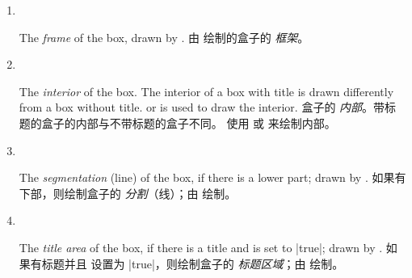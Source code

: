 \begin{enumerate}
\item 
~\vspace*{-1em}
\begin{stripedbox}
The \emph{frame} of the box, drawn by .
\tcblower
由  绘制的盒子的 \emph{框架}。
\end{stripedbox}

\item 
~\vspace*{-1em}
\begin{stripedbox}
The \emph{interior} of the box. 
The interior of a box with title is   drawn differently from a box without title.
 or    is used to draw the interior.
\tcblower
盒子的 \emph{内部}。带标题的盒子的内部与不带标题的盒子不同。 使用  或  来绘制内部。
\end{stripedbox}

\item 
~\vspace*{-1em}
\begin{stripedbox}
The \emph{segmentation} (line) of the box, if there is a lower part;
drawn by .
\tcblower
如果有下部，则绘制盒子的 \emph{分割}（线）；由  绘制。
\end{stripedbox}

\item 
~\vspace*{-1em}
\begin{stripedbox}
The \emph{title area} of the box, if there is a title and
 is set to |true|; drawn
by .
\tcblower
如果有标题并且  设置为 |true|，则绘制盒子的 \emph{标题区域}；由  绘制。
\end{stripedbox}
\end{enumerate}

